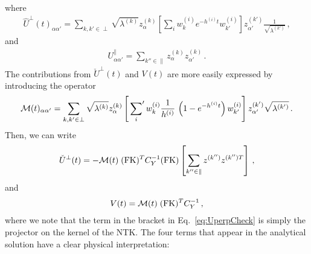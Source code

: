 where
\begin{align}
    \hat{U}^\perp(t)_{\alpha\alpha'}
        = \sum_{k,k'\in\perp} \sqrt{\lambda^{(k)}} z^{(k)}_\alpha 
            \left[\sum_i w^{(i)}_{k} e^{-h^{(i)}t} w^{(i)}_{k'}\right]
            z^{(k')}_{\alpha'} \frac{1}{\sqrt{\lambda^{(k')}}}\, ,
\end{align}
and
\begin{align}
    U^\parallel_{\alpha\alpha'}
        = \sum_{k''\in\parallel} z^{(k)}_\alpha z^{(k)}_{\alpha'} \, .
\end{align}
The contributions from $\check{U}^\perp(t)$ and $V(t)$ are more easily expressed
by introducing the operator
\begin{align}
    \label{eq:MOperatorDef}
    \mathcal{M}(t)_{\alpha\alpha'} 
        = \sum_{k,k'\in\perp} \sqrt{\lambda^{(k)}} z^{(k)}_\alpha 
            \left[\sideset{}{'}\sum_{i} w^{(i)}_{k} \frac{1}{h^{(i)}}\, 
            \left( 1- e^{-h^{(i)}t}\right) w^{(i)}_{k'}\right]
            z^{(k')}_{\alpha'} \sqrt{\lambda^{(k')}}\,. 
\end{align}
Then, we can write
\begin{align}
    \label{eq:UperpCheck}
    \check{U}^\perp(t)
        = - \mathcal{M}(t)\; (\mathrm{FK})^T C_Y^{-1} (\mathrm{FK}) 
            \left[\sum_{k''\in\parallel} z^{(k'')} z^{(k'') T}\right]\, ,
\end{align}
and
\begin{align}
    V(t) = \mathcal{M}(t)\; (\mathrm{FK})^T C_Y^{-1}\, ,
\end{align}
where we note that the term in the bracket in Eq.~\eqref{eq:UperpCheck} is
simply the projector on the kernel of the NTK. The four terms that appear in the
analytical solution have a clear physical interpretation:
